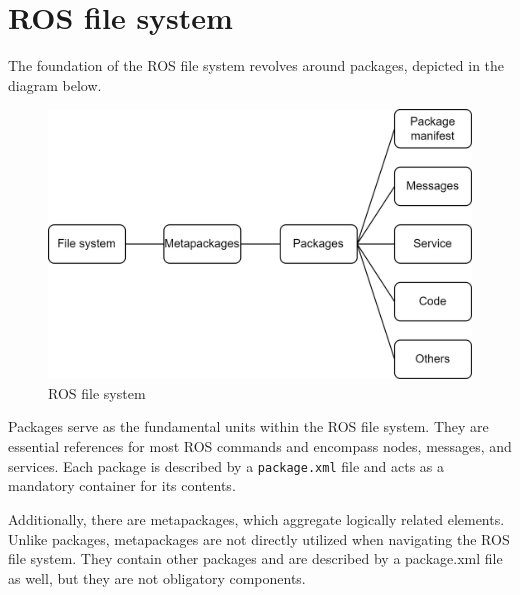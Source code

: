 \section{ROS file system}

The foundation of the ROS file system revolves around packages, depicted in the diagram below. 
\begin{figure}[H]
    \centering
    \includegraphics[width=0.75\linewidth]{images/fs.png}
    \caption{ROS file system}
\end{figure}
Packages serve as the fundamental units within the ROS file system. 
They are essential references for most ROS commands and encompass nodes, messages, and services. 
Each package is described by a \texttt{package.xml} file and acts as a mandatory container for its contents.

Additionally, there are metapackages, which aggregate logically related elements. 
Unlike packages, metapackages are not directly utilized when navigating the ROS file system. 
They contain other packages and are described by a package.xml file as well, but they are not obligatory components.

